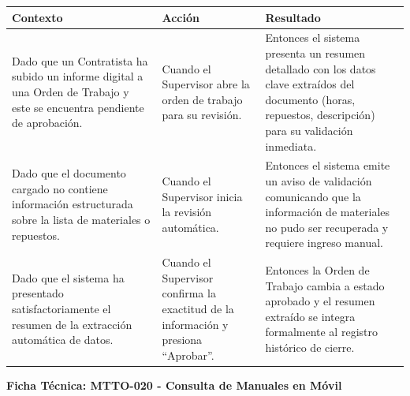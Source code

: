 \footnotesize\begin{longtable}{|p{0.28\textwidth}|p{0.32\textwidth}|p{0.34\textwidth}|}\hline
\textbf{Contexto} & \textbf{Acción} & \textbf{Resultado} \\ \hline
\parbox[t]{\linewidth}{Dado que un Contratista ha subido un informe digital a una Orden de Trabajo y este se encuentra pendiente de aprobación.} & \parbox[t]{\linewidth}{Cuando el Supervisor abre la orden de trabajo para su revisión.} & \parbox[t]{\linewidth}{Entonces el sistema presenta un resumen detallado con los datos clave extraídos del documento (horas, repuestos, descripción) para su validación inmediata.} \\ \hline
\parbox[t]{\linewidth}{Dado que el documento cargado no contiene información estructurada sobre la lista de materiales o repuestos.} & \parbox[t]{\linewidth}{Cuando el Supervisor inicia la revisión automática.} & \parbox[t]{\linewidth}{Entonces el sistema emite un aviso de validación comunicando que la información de materiales no pudo ser recuperada y requiere ingreso manual.} \\ \hline
\parbox[t]{\linewidth}{Dado que el sistema ha presentado satisfactoriamente el resumen de la extracción automática de datos.} & \parbox[t]{\linewidth}{Cuando el Supervisor confirma la exactitud de la información y presiona ``Aprobar''.} & \parbox[t]{\linewidth}{Entonces la Orden de Trabajo cambia a estado aprobado y el resumen extraído se integra formalmente al registro histórico de cierre.} \\ \hline
\end{longtable}\normalsize
\vspace{1em}
\noindent\textbf{Ficha Técnica: MTTO-020 - Consulta de Manuales en Móvil}
\footnotesize\setlength{\tabcolsep}{4pt}\renewcommand{\arraystretch}{1.2}

